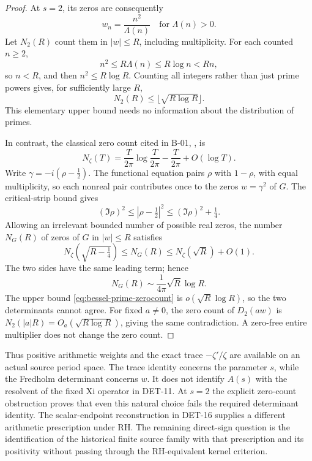 \documentclass[11pt,a4paper]{article}
\newcommand{\fid}[1]{\textsf{#1}}
\begin{document}
\begin{proof}
At \(s=2\), its zeros are consequently
\[
 w_n=\frac{n^2}{\Lambda(n)}
 \quad\text{for }\Lambda(n)>0.
\]
Let \(N_2(R)\) count them in \(|w|\le R\), including
multiplicity.  For each counted \(n\ge2\),
\[
 n^2\le R\Lambda(n)\le R\log n<Rn,
\]
so \(n<R\), and then \(n^2\le R\log R\).  Counting all integers
rather than just prime powers gives, for sufficiently large \(R\),
\begin{equation}\label{eq:bessel-prime-zerocount}
 N_2(R)\le\lfloor\sqrt{R\log R}\rfloor.
\end{equation}
This elementary upper bound needs no information about the
distribution of primes.

In contrast, the classical zero count cited in \fid{B-01},
\cite[Theorem 9.4, (9.4.3), p.~214]{titch}, is
\[
 N_\zeta(T)=\frac{T}{2\pi}\log\frac{T}{2\pi}
            -\frac{T}{2\pi}+O(\log T).
\]
Write \(\gamma=-i(\rho-\tfrac12)\).  The functional equation
pairs \(\rho\) with \(1-\rho\), with equal multiplicity, so each
nonreal pair contributes once to the zeros \(w=\gamma^2\) of
\(G\).  The critical-strip bound gives
\[
 (\Im\rho)^2\le|\rho-\tfrac12|^2
             \le(\Im\rho)^2+\tfrac14.
\]
Allowing an irrelevant bounded number of possible real zeros,
the number \(N_G(R)\) of zeros of \(G\) in \(|w|\le R\) satisfies
\[
 N_\zeta(\sqrt{R-\tfrac14})\le N_G(R)
 \le N_\zeta(\sqrt R)+O(1).
\]
The two sides have the same leading term; hence
\begin{equation}\label{eq:bessel-Xi-zerocount}
 N_G(R)\sim\frac{1}{4\pi}\sqrt R\log R.
\end{equation}
The upper bound \eqref{eq:bessel-prime-zerocount} is
\(o(\sqrt R\log R)\), so the two determinants cannot agree.
For fixed \(a\ne0\), the zero count of \(D_2(aw)\) is
\(N_2(|a|R)=O_a(\sqrt{R\log R})\), giving the same contradiction.
A zero-free entire multiplier does not change the zero count.
\end{proof}

Thus positive arithmetic weights and the exact trace
\(-\zeta'/\zeta\) are available on an actual source period space.
The trace identity concerns the parameter \(s\), while the
Fredholm determinant concerns \(w\).  It does not identify
\(A(s)\) with the resolvent of the fixed Xi operator in
\fid{DET-11}.  At \(s=2\) the explicit zero-count obstruction
proves that even this natural choice fails the required
determinant identity.  The scalar-endpoint reconstruction in
\fid{DET-16} supplies a different arithmetic prescription under
RH. The remaining direct-sign question is the identification of
the historical finite source family with that prescription and
its positivity without passing through the RH-equivalent kernel
criterion.
\end{document}
